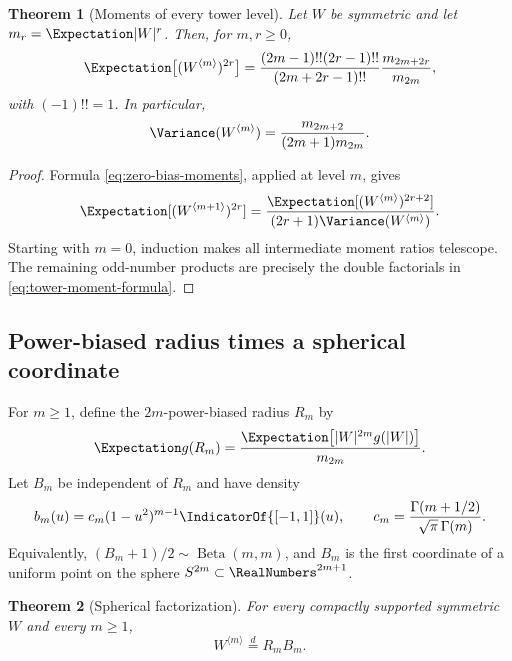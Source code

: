 \documentclass[11pt,oneside]{article}
\newtheorem{theorem}{Theorem}[section]
\theoremstyle{definition}
\theoremstyle{remark}
\begin{document}
\begin{theorem}[Moments of every tower level]
\label{thm:tower-moments}
Let $W$ be symmetric and let $m_r=\Expectation|W|^r$.  Then, for $m,r\ge0$,
\begin{equation}
 \Expectation\bigl[(W^{\langle m\rangle})^{2r}\bigr]
 =\frac{(2m-1)!!(2r-1)!!}{(2m+2r-1)!!}
  \frac{m_{2m+2r}}{m_{2m}},                         \label{eq:tower-moment-formula}
\end{equation}
with $(-1)!!=1$.  In particular,
\begin{equation}
 \Variance(W^{\langle m\rangle})
 =\frac{m_{2m+2}}{(2m+1)m_{2m}}.                    \label{eq:tower-variance}
\end{equation}
\end{theorem}

\begin{proof}
Formula \eqref{eq:zero-bias-moments}, applied at level $m$, gives
\[
 \Expectation[(W^{\langle m+1\rangle})^{2r}]
 =\frac{\Expectation[(W^{\langle m\rangle})^{2r+2}]}
        {(2r+1)\Variance(W^{\langle m\rangle})}.
\]
Starting with $m=0$, induction makes all intermediate moment ratios telescope.
The remaining odd-number products are precisely the double factorials in
\eqref{eq:tower-moment-formula}.
\end{proof}

\subsection{Power-biased radius times a spherical coordinate}

For $m\ge1$, define the $2m$-power-biased radius $R_m$ by
\begin{equation}
 \Expectation g(R_m)
 =\frac{\Expectation\bigl[|W|^{2m}g(|W|)\bigr]}{m_{2m}}.       \label{eq:power-radius}
\end{equation}
Let $B_m$ be independent of $R_m$ and have density
\begin{equation}
 b_m(u)=c_m(1-u^2)^{m-1}\IndicatorOf{[-1,1]}(u),
 \qquad
 c_m=\frac{\Gamma(m+1/2)}{\sqrt\pi\,\Gamma(m)}.    \label{eq:Bm-density}
\end{equation}
Equivalently, $(B_m+1)/2\sim\operatorname{Beta}(m,m)$, and $B_m$ is the first
coordinate of a uniform point on the sphere $S^{2m}\subset\RealNumbers^{2m+1}$.

\begin{theorem}[Spherical factorization]
\label{thm:spherical-factorization}
For every compactly supported symmetric $W$ and every $m\ge1$,
\begin{equation}
 W^{\langle m\rangle}\stackrel d=R_mB_m.            \label{eq:spherical-factorization}
\end{equation}
\end{theorem}
\end{document}
